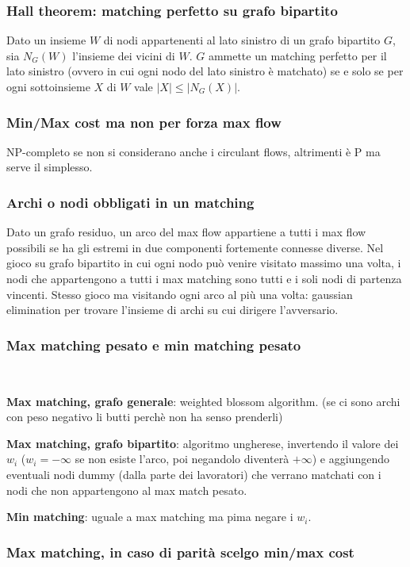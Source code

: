 \subsubsection{Hall theorem: matching perfetto su grafo bipartito}
Dato un insieme $W$ di nodi appartenenti al lato sinistro di un grafo bipartito $G$, sia $N_G(W)$ l'insieme dei vicini di $W$. $G$ ammette un matching perfetto per il lato sinistro (ovvero in cui ogni nodo del lato sinistro è matchato) se e solo se per ogni sottoinsieme $X$ di $W$ vale $|X|\leq|N_G(X)|$.

\subsubsection{Min/Max cost ma non per forza max flow}
NP-completo se non si considerano anche i circulant flows, altrimenti è P ma serve il simplesso.

\subsubsection{Archi o nodi obbligati in un matching}
Dato un grafo residuo, un arco del max flow appartiene a tutti i max flow possibili se ha gli estremi in due componenti fortemente connesse diverse. Nel gioco su grafo bipartito in cui ogni nodo può venire visitato massimo una volta, i nodi che appartengono a tutti i max matching sono tutti e i soli nodi di partenza vincenti. Stesso gioco ma visitando ogni arco al più una volta: gaussian elimination per trovare l'insieme di archi su cui dirigere l'avversario.

\subsubsection{Max matching pesato e min matching pesato}
\,

\textbf{Max matching, grafo generale}: weighted blossom algorithm. (se ci sono archi con peso negativo li butti perchè non ha senso prenderli)

\textbf{Max matching, grafo bipartito}: algoritmo ungherese, invertendo il valore dei $w_i$ ($w_i=-\infty$ se non esiste l'arco, poi negandolo diventerà $+\infty$) e aggiungendo eventuali nodi dummy (dalla parte dei lavoratori) che verrano matchati con i nodi che non appartengono al max match pesato.

\textbf{Min matching}: uguale a max matching ma pima negare i $w_i$.

\subsubsection{Max matching, in caso di parità scelgo min/max cost}
\,

